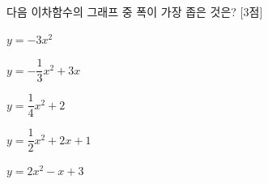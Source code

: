 다음 이차함수의 그래프 중 폭이 가장 좁은 것은? \mbox{[3점]}
\begin{choicesii}{\rule[-3ex]{0pt}{8ex}$y=-3x^2$}{\rule[-3ex]{0pt}{8ex}$y=-\dfrac{1}{3}x^2+3x$}{\rule[-3ex]{0pt}{8ex}$y=\dfrac{1}{4}x^2+2$}{\rule[-3ex]{0pt}{8ex}$y=\dfrac{1}{2}x^2+2x+1$}{\rule[-3ex]{0pt}{8ex}$y=2x^2-x+3$}\end{choicesii}
